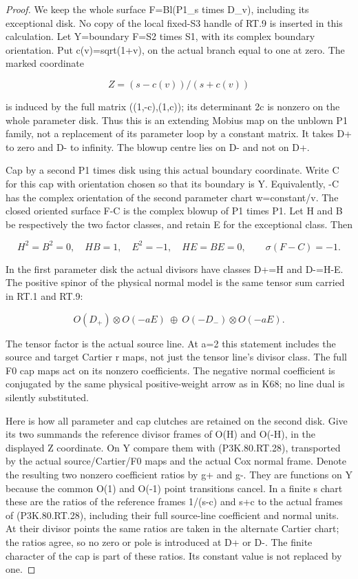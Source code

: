\begin{proof}
We keep the whole surface F=Bl(P1\_s times D\_v), including its
exceptional disk. No copy of the local fixed-S3 handle of RT.9 is
inserted in this calculation. Let Y=boundary F=S2 times S1, with
its complex boundary orientation. Put c(v)=sqrt(1+v), on the actual
branch equal to one at zero. The marked coordinate

\[
 Z=(s-c(v))/(s+c(v))
\]

is induced by the full matrix ((1,-c),(1,c)); its determinant 2c
is nonzero on the whole parameter disk. Thus this is an extending
Mobius map on the unblown P1 family, not a replacement of its
parameter loop by a constant matrix. It takes D+ to zero and D-
to infinity. The blowup centre lies on D- and not on D+.

Cap by a second P1 times disk using this actual boundary coordinate.
Write C for this cap with orientation chosen so that its boundary
is Y. Equivalently, -C has the complex orientation of the second
parameter chart w=constant/v. The closed oriented surface F-C is
the complex blowup of P1 times P1. Let H and B be respectively the
two factor classes, and retain E for the exceptional class. Then

\[
 H^2=B^2=0,\quad H B=1,\quad E^2=-1,\quad
 H E=B E=0,\qquad \sigma(F-C)=-1.                 \tag{P3K.80.RT.27}
\]

In the first parameter disk the actual divisors have classes
D+=H and D-=H-E. The positive spinor of the physical normal
model is the same tensor sum carried in RT.1 and RT.9:

\[
 O(D_+)\otimes O(-aE)\ \oplus\
 O(-D_-)\otimes O(-aE).                           \tag{P3K.80.RT.28}
\]

The tensor factor is the actual source line. At a=2 this statement
includes the source and target Cartier r maps, not just the tensor
line's divisor class. The full F0 cap maps act on its nonzero
coefficients. The negative normal coefficient is conjugated by the
same physical positive-weight arrow as in K68; no line dual is
silently substituted.

Here is how all parameter and cap clutches are retained on the
second disk. Give its two summands the reference divisor frames
of O(H) and O(-H), in the displayed Z coordinate. On Y compare
them with (P3K.80.RT.28), transported by the actual source/Cartier/F0
maps and the actual Cox normal frame. Denote the resulting two
nonzero coefficient ratios by g+ and g-. They are functions on
Y because the common O(1) and O(-1) point transitions cancel.
In a finite s chart these are the ratios of the reference frames
1/(s-c) and s+c to the actual frames of (P3K.80.RT.28), including their
full source-line coefficient and normal units. At their divisor
points the same ratios are taken in the alternate Cartier chart;
the ratios agree, so no zero or pole is introduced at D+ or D-.
The finite character of the cap is part of these ratios. Its
constant value is not replaced by one.


\end{proof}
